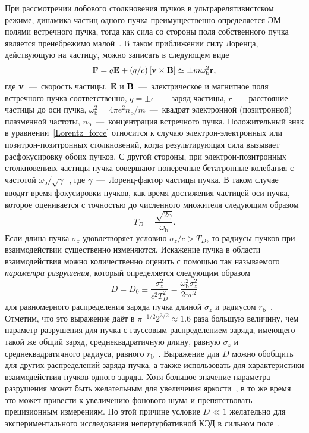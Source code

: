 При рассмотрении лобового столкновения пучков в ультрарелятивистском режиме, динамика частиц одного пучка преимущественно определяется ЭМ полями встречного пучка, тогда как сила со стороны поля собственного пучка является пренебрежимо малой~\cite{davidson2001physics,katsouleas1990plasma}.
В таком приближении силу Лоренца, действующую на частицу, можно записать в следующем виде
\begin{equation}
\vb{F} = q \vb{E} + (q/c) \left[ \vb{v} \times \vb{B}  \right] \simeq \pm m \omega_\mathrm{b}^2 \vb{r},
\label{Lorentz_force}
\end{equation} 
где $\vb{v}$~---~скорость частицы, $\vb{E}$ и $\vb{B}$~---~электрическое и магнитное поля встречного пучка соответственно, $q=\pm e$~---~заряд частицы, $r$~---~расстояние частицы до оси пучка, $\omega_\mathrm{b}^2 = 4 \pi e^2 n_\mathrm{b}/m$~---~квадрат электронной (позитронной) плазменной частоты, $n_\mathrm{b}$~---~концентрация встречного пучка.
Положительный знак в уравнении~\eqref{Lorentz_force} относится к случаю электрон-электронных или позитрон-позитронных столкновений, когда результирующая сила вызывает расфокусировку обоих пучков.
С другой стороны, при электрон-позитронных столкновениях частицы пучка совершают поперечные бетатронные колебания с частотой $\omega_\mathrm{b}/ \sqrt{\gamma}$~\cite{chen1988introduction,chen1988disruption}, где $\gamma$~---~Лоренц-фактор частицы пучка.
В таком случае вводят время фокусировки пучков, как время достижения частицей оси пучка, которое оценивается с точностью до численного множителя следующим образом
\begin{equation}
T_D = \frac{\sqrt{2\gamma} }{\omega_\mathrm{b}} .
\label{td}
\end{equation}  
Если длина пучка $\sigma_z$ удовлетворяет условию $\sigma_z/c > T_D$, то радиусы пучков при взаимодействии существенно изменяются.
Искажение пучка в области взаимодействия можно количественно оценить с помощью так называемого \textit{параметра разрушения}, который определяется следующим образом
\begin{equation}
    D = D_0 \equiv \frac{\sigma^2_z}{c^2 T_D^2} = \frac{\omega^2_\mathrm{b} \sigma^2_z}{2 \gamma c^2 }
    \label{d1}
\end{equation} 
для равномерного распределения заряда пучка длиной $\sigma_z$ и радиусом $r_\mathrm{b}$~\cite{hollebeek1981disruption}.
Отметим, что это выражение даёт в $\pi^{-1/2} 2^{3/2}\approx 1.6$ раза большую величину, чем параметр разрушения для пучка с гауссовым распределением заряда, имеющего такой же общий заряд, среднеквадратичную длину, равную $\sigma_z$ и среднеквадратичного радиуса, равного $r_\mathrm{b}$~\cite{hollebeek1981disruption,chen1988introduction}.
Выражение для $D$ можно обобщить для других распределений заряда пучка, а также использовать для характеристики взаимодействия пучков одного заряда.
Хотя большое значение параметра разрушения может быть желательным для увеличения яркости~\cite{phinney2000slc}, в то же время это может привести к увеличению фонового шума и препятствовать прецизионным измерениям.
По этой причине условие $D\ll 1$ желательно для экспериментального исследования непертурбативной КЭД в сильном поле~\cite{yakimenko2019prospect}.

